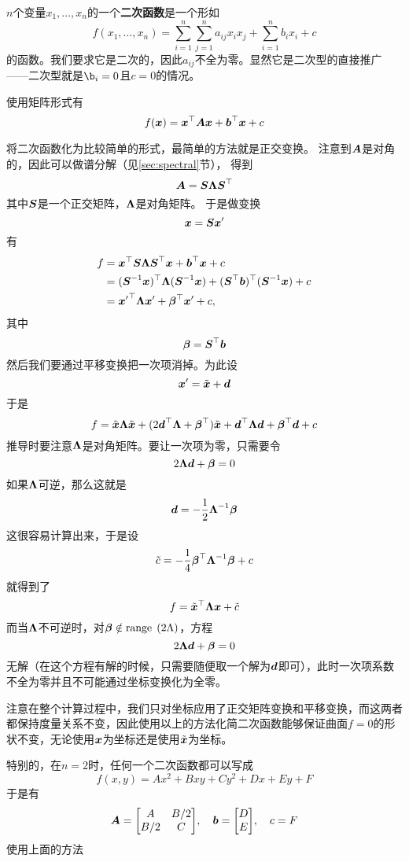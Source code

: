 \documentclass[UTF8]{ctexart}
\newcommand*{\range}{\mathrm{range}\;}
\theoremstyle{definition}
\begin{document}
$n$个变量$x_1, \ldots, x_n$的一个\textbf{二次函数}是一个形如
\[
f(x_1, \ldots, x_n) = \sum_{i=1}^n \sum_{j=1}^n a_{ij}x_i x_j + \sum_{i=1}^n b_i x_i + c
\]
的函数。我们要求它是二次的，因此$a_{ij}$不全为零。显然它是二次型的直接推广——二次型就是$\b_i=0$且$c=0$的情况。

使用矩阵形式有
\[
f(\vb*{x}) = \vb*{x}^\top \vb*{A} \vb*{x} + \vb*{b}^\top \vb*{x} + c
\]

将二次函数化为比较简单的形式，最简单的方法就是正交变换。
注意到$\vb*{A}$是对角的，因此可以做谱分解（见\ref{sec:spectral}节），
得到
\[
    \vb*{A} = \vb*{S} \vb*{\Lambda} \vb*{S}^\top
\]
其中$\vb*{S}$是一个正交矩阵，$\vb*{\Lambda}$是对角矩阵。
于是做变换
\[
    \vb*{x} = \vb*{S} \vb*{x}'
\]
有
\[
    \begin{aligned}
        f &= \vb*{x}^\top \vb*{S} \vb*{\Lambda} \vb*{S}^\top \vb*{x} + \vb*{b}^\top \vb*{x} + c \\
        &= (\vb*{S}^{-1} \vb*{x})^\top \vb*{\Lambda} (\vb*{S}^{-1} \vb*{x}) + (\vb*{S}^\top \vb*{b})^\top (\vb*{S}^{-1} \vb*{x}) + c \\
        &= {\vb*{x}'}^\top \vb*{\Lambda} \vb*{x}' + \vb*{\beta}^\top \vb*{x}' + c,
    \end{aligned}
\]
其中
\[
    \vb*{\beta} = \vb*{S}^\top \vb*{b}
\]
然后我们要通过平移变换把一次项消掉。为此设
\[
    \vb*{x}' = \tilde{\vb*{x}} + \vb*{d}
\]
于是
\[
    f = \tilde{\vb*{x}} \vb*{\Lambda} \tilde{\vb*{x}} + (2 \vb*{d}^\top \vb*{\Lambda} + \vb*{\beta}^\top) \tilde{\vb*{x}} + \vb*{d}^\top \vb*{\Lambda} \vb*{d} + \vb*{\beta}^\top \vb*{d} + c
\]
推导时要注意$\vb*{\Lambda}$是对角矩阵。要让一次项为零，只需要令
\[
    2 \vb*{\Lambda} \vb*{d} + \vb*{\beta} = 0
\]
如果$\vb*{\Lambda}$可逆，那么这就是
\[
    \vb*{d} = - \frac{1}{2} \vb*{\Lambda}^{-1} \vb*{\beta}
\]
这很容易计算出来，于是设
\[
    \tilde{c} = -\frac{1}{4} \vb*{\beta}^\top \vb*{\Lambda}^{-1} \vb*{\beta} + c
\]
就得到了
\[
    f = \tilde{\vb*{x}}^\top \vb*{\Lambda} \vb*{x} + \tilde{c}
\]
而当$\vb*{\Lambda}$不可逆时，对$\vb*{\beta} \notin \range\left(2\Lambda\right)$，方程
\[
    2 \vb*{\Lambda} \vb*{d} + \vb*{\beta} = 0
\]
无解（在这个方程有解的时候，只需要随便取一个解为$\vb*{d}$即可），此时一次项系数不全为零并且不可能通过坐标变换化为全零。

注意在整个计算过程中，我们只对坐标应用了正交矩阵变换和平移变换，而这两者都保持度量关系不变，因此使用以上的方法化简二次函数能够保证曲面$f=0$的形状不变，无论使用$\vb*{x}$为坐标还是使用$\tilde{\vb*{x}}$为坐标。

特别的，在$n=2$时，任何一个二次函数都可以写成
\[
    f(x, y) = Ax^2 + Bxy + Cy^2 + Dx + Ey + F
\]
于是有
\[
    \vb*{A} = \mqty[A & B/2 \\ B/2 & C], \quad \vb*{b} = \mqty[D \\ E], \quad c = F
\]
使用上面的方法
\end{document}

